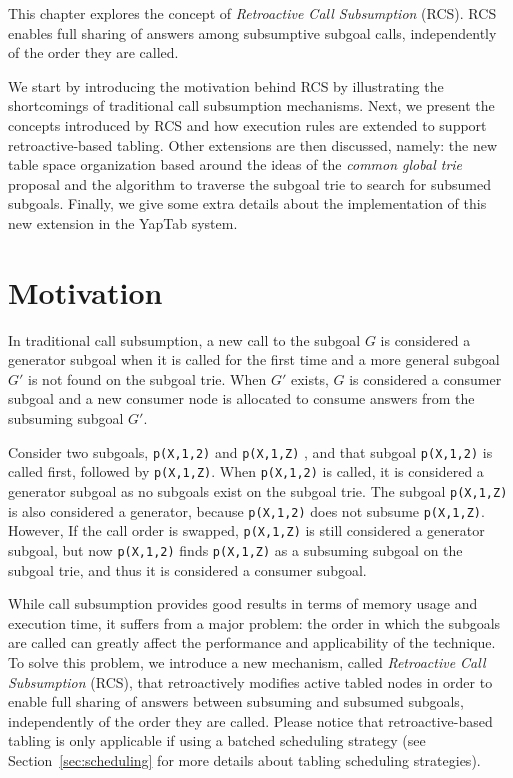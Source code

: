 This chapter explores the concept of \emph{Retroactive Call Subsumption} (RCS). RCS
enables full sharing of answers among subsumptive subgoal calls, independently of the order they are called.

We start by introducing the motivation behind RCS by illustrating the shortcomings of traditional call
subsumption mechanisms. Next, we present the concepts introduced by RCS and how execution
rules are extended to support retroactive-based tabling. Other extensions are then discussed, namely:
the new table space organization based around the ideas of the \textit{common global trie} proposal
\cite{CostaJ-08} and the algorithm to traverse the subgoal trie to search for subsumed subgoals. Finally, we
give some extra details about the implementation of this new extension in the YapTab system.

\section{Motivation}

In traditional call subsumption, a new call to the subgoal $G$ is considered a generator subgoal
when it is called for the first time and a more general subgoal $G'$ is not found on the subgoal trie.
When $G'$ exists, $G$ is considered a consumer subgoal and a new consumer node is allocated to consume
answers from the subsuming subgoal $G'$.

Consider two subgoals, \texttt{p(X,1,2)} and \texttt{p(X,1,Z)} , and that subgoal \texttt{p(X,1,2)} is called first,
followed by \texttt{p(X,1,Z)}. When \texttt{p(X,1,2)} is called, it is considered a generator subgoal as no subgoals
exist on the subgoal trie. The subgoal \texttt{p(X,1,Z)} is also considered a generator, because
\texttt{p(X,1,2)} does not subsume \texttt{p(X,1,Z)}. However, If the call order is swapped, \texttt{p(X,1,Z)} is still
considered a generator subgoal, but now \texttt{p(X,1,2)} finds \texttt{p(X,1,Z)} as a subsuming subgoal
on the subgoal trie, and thus it is considered a consumer subgoal.

While call subsumption provides good results in terms of memory usage and execution time, it suffers from a
major problem: the order in which the subgoals are called can greatly affect the performance
and applicability of the technique. To solve this problem, we introduce a new mechanism, called \textit{Retroactive Call
Subsumption} (RCS), that retroactively modifies active tabled nodes in order to enable full sharing
of answers between subsuming and subsumed subgoals, independently of the order they are called.
Please notice that retroactive-based tabling is only applicable if using a batched scheduling strategy
(see Section~\ref{sec:scheduling} for more details about tabling scheduling strategies).

